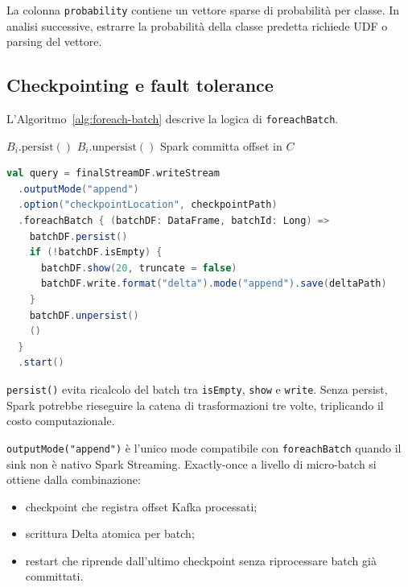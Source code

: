 La colonna \texttt{probability} contiene un vettore sparse di probabilità per classe.
In analisi successive, estrarre la probabilità della classe predetta richiede UDF o parsing del vettore.

\subsection{Checkpointing e fault tolerance}\label{subsec:checkpointing}

L'Algoritmo~\ref{alg:foreach-batch} descrive la logica di \texttt{foreachBatch}.

\begin{algorithm}[H]
  \caption{Elaborazione micro-batch con \texttt{foreachBatch}}\label{alg:foreach-batch}
  \BlankLine
  $B_i.\text{persist}()$\;
  $B_i.\text{unpersist}()$\;
  Spark committa offset in $C$\;
\end{algorithm}

\begin{lstlisting}[language=Scala,caption={Implementazione \texttt{foreachBatch} con Delta Lake.},label={lst:foreach-batch}]
val query = finalStreamDF.writeStream
  .outputMode("append")
  .option("checkpointLocation", checkpointPath)
  .foreachBatch { (batchDF: DataFrame, batchId: Long) =>
    batchDF.persist()
    if (!batchDF.isEmpty) {
      batchDF.show(20, truncate = false)
      batchDF.write.format("delta").mode("append").save(deltaPath)
    }
    batchDF.unpersist()
    ()
  }
  .start()
\end{lstlisting}

\texttt{persist()} evita ricalcolo del batch tra \texttt{isEmpty}, \texttt{show} e \texttt{write}.
Senza persist, Spark potrebbe rieseguire la catena di trasformazioni tre volte, triplicando il costo computazionale.

\texttt{outputMode("append")} è l'unico mode compatibile con \texttt{foreachBatch} quando il sink non è nativo Spark Streaming.
Exactly-once a livello di micro-batch si ottiene dalla combinazione:
\begin{itemize}
  \item checkpoint che registra offset Kafka processati;
  \item scrittura Delta atomica per batch;
  \item restart che riprende dall'ultimo checkpoint senza riprocessare batch già committati.
\end{itemize}

